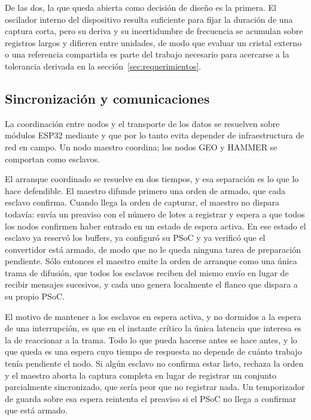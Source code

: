 De las dos, la que queda abierta como decisión de diseño es la primera. El oscilador interno del dispositivo resulta suficiente para fijar la duración de una captura corta, pero su deriva y su incertidumbre de frecuencia se acumulan sobre registros largos y difieren entre unidades, de modo que evaluar un cristal externo o una referencia compartida es parte del trabajo necesario para acercarse a la tolerancia derivada en la sección~\ref{sec:requerimientos}.

\subsection{Sincronización y comunicaciones}
\label{sec:sincronizacion}

La coordinación entre nodos y el transporte de los datos se resuelven sobre módulos ESP32 mediante  y que por lo tanto evita depender de infraestructura de red en campo. Un nodo maestro coordina; los nodos GEO y HAMMER se comportan como esclavos.

El arranque coordinado se resuelve en dos tiempos, y esa separación es lo que lo hace defendible. El maestro difunde primero una orden de armado, que cada esclavo confirma. Cuando llega la orden de capturar, el maestro no dispara todavía: envía un preaviso con el número de lotes a registrar y espera a que todos los nodos confirmen haber entrado en un estado de espera activa. En ese estado el esclavo ya reservó los buffers, ya configuró su PSoC y ya verificó que el convertidor está armado, de modo que no le queda ninguna tarea de preparación pendiente. Sólo entonces el maestro emite la orden de arranque como una única trama de difusión, que todos los esclavos reciben del mismo envío en lugar de recibir mensajes sucesivos, y cada uno genera localmente el flanco que dispara a su propio PSoC.

El motivo de mantener a los esclavos en espera activa, y no dormidos a la espera de una interrupción, es que en el instante crítico la única latencia que interesa es la de reaccionar a la trama. Todo lo que pueda hacerse antes se hace antes, y lo que queda es una espera cuyo tiempo de respuesta no depende de cuánto trabajo tenía pendiente el nodo. Si algún esclavo no confirma estar listo, rechaza la orden y el maestro aborta la captura completa en lugar de registrar un conjunto parcialmente sincronizado, que sería peor que no registrar nada. Un temporizador de guarda sobre esa espera reintenta el preaviso si el PSoC no llega a confirmar que está armado.

